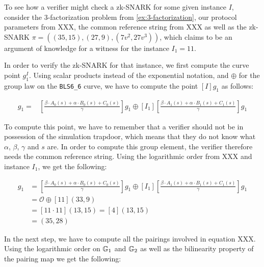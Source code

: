 \begin{example} To see how a verifier might check  
a zk-SNARK for some given instance $I$, consider the $3$-factorization problem from \ref{ex:3-factorization}, our protocol parameters from XXX, the common reference string from XXX as well as the zk-SNARK $\pi=((35,15),(27,9),(7v^2,27v^3))$, which claims to be an argument of knowledge for a witness for the instance $I_1=11$.

In order to verify the zk-SNARK for that instance, we first compute the curve point $g_1^I$. Using scalar products instead of the exponential notation, and $\oplus$ for the group law on the \texttt{BLS6\_6} curve, we have to compute the point $[I]g_1$ as follows:

\begin{align*}
[I]g_1 = & [\frac{\beta\cdot A_{0}(s)+\alpha\cdot B_{0}(s)+C_{0}(s)}{\gamma}]g_1 \oplus [I_1][\frac{\beta\cdot A_{1}(s)+\alpha\cdot B_{1}(s)+C_{1}(s)}{\gamma}]g_1
\end{align*}

To compute this point, we have to remember that a verifier should not be in possession of the simulation trapdoor, which means that they do not know what $\alpha$, $\beta$, $\gamma$ and $s$ are. In order to compute this group element, the verifier therefore needs the common reference string. Using the logarithmic order from XXX and instance $I_1$, we get the following:

\begin{align*}
[I]g_1 & = [\frac{\beta\cdot A_{0}(s)+\alpha\cdot B_{0}(s)+C_{0}(s)}{\gamma}]g_1 \oplus [I_1][\frac{\beta\cdot A_{1}(s)+\alpha\cdot B_{1}(s)+C_{1}(s)}{\gamma}]g_1\\
       & = \mathcal{O} \oplus [11](33,9)\\
       & = [11\cdot 11](13,15) = [4](13,15)\\
       & = (35,28)
\end{align*} 

In the next step, we have to compute all the pairings involved in equation XXX. Using the logarithmic order on $\mathbb{G}_1$ and $\mathbb{G}_2$ as well as the bilinearity property of the pairing map we get the following:


\end{example}
